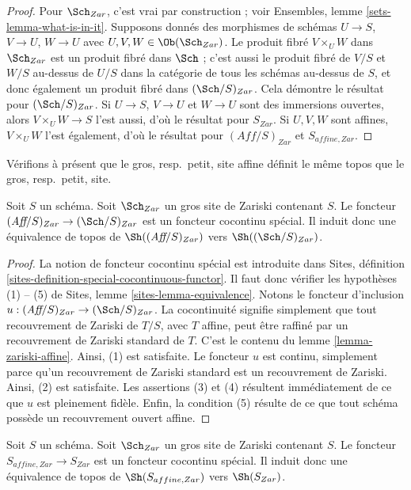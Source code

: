 \begin{proof}
Pour $\Sch_{Zar}$, c'est vrai par construction ; voir
Ensembles, lemme \ref{sets-lemma-what-is-in-it}.
Supposons donnés des morphismes de schémas $U \to S$, $V \to U$, $W \to U$
avec $U, V, W \in \Ob(\Sch_{Zar})$.
Le produit fibré $V \times_U W$ dans $\Sch_{Zar}$
est un produit fibré dans $\Sch$ ; c'est aussi
le produit fibré de $V/S$ et $W/S$ au-dessus de $U/S$ dans
la catégorie de tous les schémas au-dessus de $S$, et donc également un
produit fibré dans $(\Sch/S)_{Zar}$.
Cela démontre le résultat pour $(\Sch/S)_{Zar}$.
Si $U \to S$, $V \to U$ et $W \to U$ sont des immersions ouvertes, alors
$V \times_U W \to S$ l'est aussi, d'où le résultat pour $S_{Zar}$.
Si $U, V, W$ sont affines, $V \times_U W$ l'est également, d'où le
résultat pour $(\textit{Aff}/S)_{Zar}$ et $S_{affine, Zar}$.
\end{proof}

\noindent
Vérifions à présent que le gros, resp.\ petit, site affine définit le même
topos que le gros, resp.\ petit, site.

\begin{lemma}
\label{lemma-affine-big-site-Zariski}
Soit $S$ un schéma. Soit $\Sch_{Zar}$ un gros site de Zariski
contenant $S$.
Le foncteur $(\textit{Aff}/S)_{Zar} \to (\Sch/S)_{Zar}$
est un foncteur cocontinu spécial. Il induit donc une équivalence
de topos de $\Sh((\textit{Aff}/S)_{Zar})$ vers
$\Sh((\Sch/S)_{Zar})$.
\end{lemma}

\begin{proof}
La notion de foncteur cocontinu spécial est introduite dans
Sites, définition \ref{sites-definition-special-cocontinuous-functor}.
Il faut donc vérifier les hypothèses (1) -- (5) de
Sites, lemme \ref{sites-lemma-equivalence}.
Notons le foncteur d'inclusion
$u : (\textit{Aff}/S)_{Zar} \to (\Sch/S)_{Zar}$.
La cocontinuité signifie simplement que tout recouvrement de Zariski de
$T/S$, avec $T$ affine, peut être raffiné par un recouvrement de Zariski standard de $T$.
C'est le contenu du
lemme \ref{lemma-zariski-affine}.
Ainsi, (1) est satisfaite. Le foncteur $u$ est continu, simplement parce qu'un recouvrement
de Zariski standard est un recouvrement de Zariski. Ainsi, (2) est satisfaite.
Les assertions (3) et (4) résultent immédiatement de ce que $u$ est
pleinement fidèle. Enfin, la condition (5) résulte de ce que
tout schéma possède un recouvrement ouvert affine.
\end{proof}

\begin{lemma}
\label{lemma-alternative-zariski}
Soit $S$ un schéma. Soit $\Sch_{Zar}$ un gros site de Zariski
contenant $S$. Le foncteur $S_{affine, Zar} \to S_{Zar}$
est un foncteur cocontinu spécial. Il induit donc une équivalence
de topos de $\Sh(S_{affine, Zar})$ vers $\Sh(S_{Zar})$.
\end{lemma}

